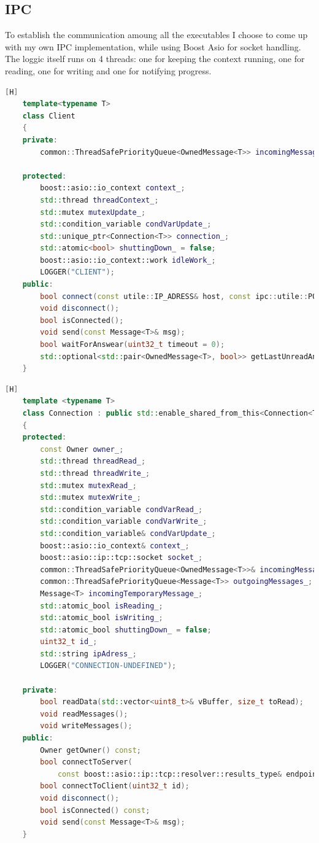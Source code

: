 \documentclass[17pt]{article}
\begin{document}
\pagebreak
\subsection{IPC}
\indent \indent
To establish the communication amoung all the executables I choose to come up with 
my own IPC implementation, while using Boost Asio for socket handling. The loggic 
itself runs on 4 threads: one for keeping the context running, one for reading,
one for writing and one for notifying progress.


\begin{lstlisting}[language = C++][H]
    template<typename T>
    class Client
    {
    private:
        common::ThreadSafePriorityQueue<OwnedMessage<T>> incomingMessages_;

    protected:
        boost::asio::io_context context_;
        std::thread threadContext_;
        std::mutex mutexUpdate_;
        std::condition_variable condVarUpdate_;
        std::unique_ptr<Connection<T>> connection_;
        std::atomic<bool> shuttingDown_ = false;
        boost::asio::io_context::work idleWork_;
        LOGGER("CLIENT");
    public:
        bool connect(const utile::IP_ADRESS& host, const ipc::utile::PORT port);
        void disconnect();
        bool isConnected();
        void send(const Message<T>& msg);
        bool waitForAnswear(uint32_t timeout = 0);
        std::optional<std::pair<OwnedMessage<T>, bool>> getLastUnreadAnswear();
    }
\end{lstlisting}

\pagebreak

\begin{lstlisting}[language = C++][H]
    template <typename T>
    class Connection : public std::enable_shared_from_this<Connection<T>>
    {
    protected:
        const Owner owner_;
        std::thread threadRead_;
        std::thread threadWrite_;
        std::mutex mutexRead_;
        std::mutex mutexWrite_;
        std::condition_variable condVarRead_;
        std::condition_variable condVarWrite_;
        std::condition_variable& condVarUpdate_;
        boost::asio::io_context& context_;
        boost::asio::ip::tcp::socket socket_;
        common::ThreadSafePriorityQueue<OwnedMessage<T>>& incomingMessages_;
        common::ThreadSafePriorityQueue<Message<T>> outgoingMessages_;
        Message<T> incomingTemporaryMessage_;
        std::atomic_bool isReading_;
        std::atomic_bool isWriting_;
        std::atomic_bool shuttingDown_ = false;
        uint32_t id_;
        std::string ipAdress_;
        LOGGER("CONNECTION-UNDEFINED");

    private:
        bool readData(std::vector<uint8_t>& vBuffer, size_t toRead);
        void readMessages();
        void writeMessages();
    public:
        Owner getOwner() const;
        bool connectToServer(
            const boost::asio::ip::tcp::resolver::results_type& endpoints);
        bool connectToClient(uint32_t id);
        void disconnect();
        bool isConnected() const;
        void send(const Message<T>& msg);
    }
\end{lstlisting}
\end{document}
